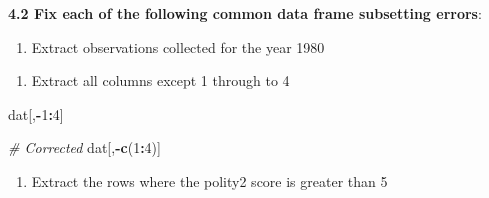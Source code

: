 \documentclass[]{book}
\newenvironment{Shaded}{\begin{snugshade}}{\end{snugshade}}
\newcommand{\CommentTok}[1]{\textcolor[rgb]{0.56,0.35,0.01}{\textit{#1}}}
\newcommand{\DecValTok}[1]{\textcolor[rgb]{0.00,0.00,0.81}{#1}}
\newcommand{\KeywordTok}[1]{\textcolor[rgb]{0.13,0.29,0.53}{\textbf{#1}}}
\newcommand{\NormalTok}[1]{#1}
\newcommand{\OperatorTok}[1]{\textcolor[rgb]{0.81,0.36,0.00}{\textbf{#1}}}
\newcommand{\StringTok}[1]{\textcolor[rgb]{0.31,0.60,0.02}{#1}}
\providecommand{\tightlist}{%
  \setlength{\itemsep}{0pt}\setlength{\parskip}{0pt}}
\begin{document}
\textbf{4.2 Fix each of the following common data frame subsetting errors}:

\begin{enumerate}
\def\labelenumi{\arabic{enumi}.}
\tightlist
\item
  Extract observations collected for the year 1980
\end{enumerate}

\begin{Shaded}
\end{Shaded}

\begin{enumerate}
\def\labelenumi{\arabic{enumi}.}
\setcounter{enumi}{1}
\tightlist
\item
  Extract all columns except 1 through to 4
\end{enumerate}

\begin{Shaded}
\begin{Highlighting}[]
\NormalTok{dat[,}\OperatorTok{-}\DecValTok{1}\OperatorTok{:}\DecValTok{4}\NormalTok{]}

\CommentTok{# Corrected}
\NormalTok{dat[,}\OperatorTok{-}\KeywordTok{c}\NormalTok{(}\DecValTok{1}\OperatorTok{:}\DecValTok{4}\NormalTok{)]}
\end{Highlighting}
\end{Shaded}

\begin{enumerate}
\def\labelenumi{\arabic{enumi}.}
\setcounter{enumi}{2}
\tightlist
\item
  Extract the rows where the polity2 score is greater than 5
\end{enumerate}

\begin{Shaded}
\end{Shaded}
\end{document}
